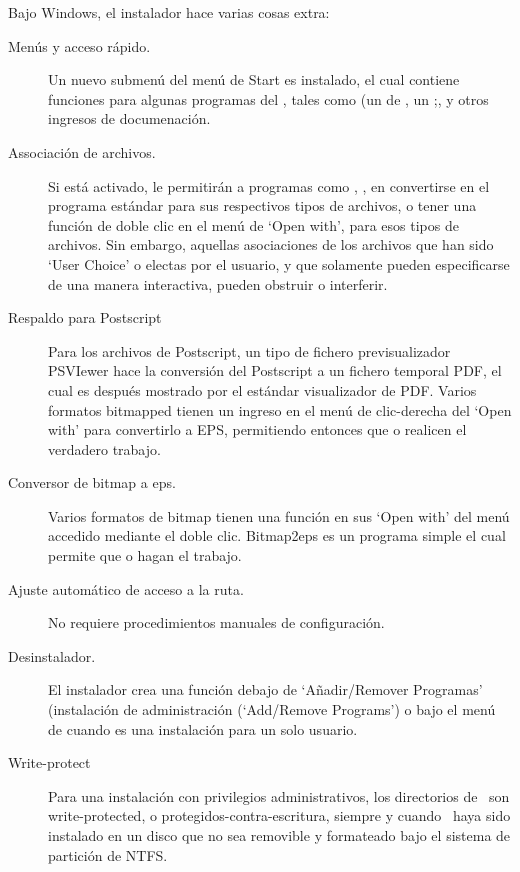 \documentclass{article}
\begin{document}
Bajo Windows, el instalador hace varias cosas extra:
\begin{description}
\item[Menús y acceso rápido.] Un nuevo submenú del menú de Start es
	instalado, el cual contiene funciones para algunas programas
	del \GUI{}, tales como  (un \GUI{} de , un
	 ;, y otros ingresos de documenación.

\item[Associación de archivos.] Si está activado, le permitirán a
	programas como , , 
	en convertirse en el programa estándar para sus
	respectivos tipos de archivos, o tener una función de doble
	clic en el menú de `Open with', para esos tipos de archivos.
	Sin embargo, aquellas asociaciones de los archivos que han sido
	`User Choice' o electas por el usuario, y que solamente pueden
	especificarse de una manera interactiva, pueden obstruir o interferir.

\item[Respaldo para Postscript] Para los archivos de Postscript, un
 	tipo de fichero previsualizador PSVIewer hace la conversión del
	Postscript a un fichero temporal PDF, el cual es después mostrado por el
	estándar visualizador de PDF. Varios formatos bitmapped tienen un
	ingreso  en el menú de clic-derecha del `Open with'
	para convertirlo a EPS, permitiendo entonces que 
	o  realicen el verdadero trabajo.

\item[Conversor de bitmap a eps.] Varios formatos de bitmap tienen una
	función  en sus `Open with' del menú accedido
	mediante el doble clic. Bitmap2eps es un programa simple el
	cual permite que  o  hagan el
	trabajo.

\item[Ajuste automático de acceso a la ruta.] No requiere
	procedimientos manuales de configuración.

\item[Desinstalador.] El instalador crea una función debajo de
	`Añadir/Remover Programas' (instalación de administración
	(`Add/Remove Programs') o bajo el menú de  \TL{} cuando es una
	instalación para un solo usuario. 

\item[Write-protect] Para una instalación con privilegios
	administrativos, los directorios de \TL\ son
	write-protected, o protegidos-contra-escritura,
	siempre y cuando \TL\ haya sido instalado en un disco
	que no sea removible y formateado bajo el sistema de
	partición de NTFS. 
\end{description}
	
\end{document}
